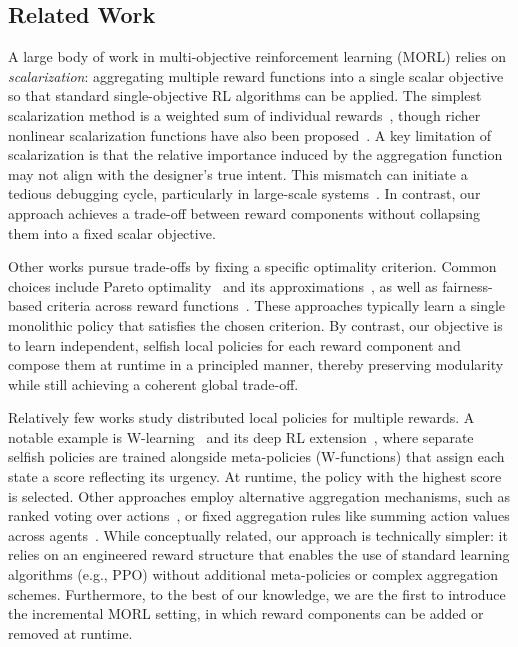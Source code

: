 \subsection{Related Work}

A large body of work in multi-objective reinforcement learning (MORL) relies on \emph{scalarization}: aggregating multiple reward functions into a single scalar objective so that standard single-objective RL algorithms can be applied. The simplest scalarization method is a weighted sum of individual rewards~\citep{gass1955computational}, though richer nonlinear scalarization functions have also been proposed~\citep{van2013scalarized}. A key limitation of scalarization is that the relative importance induced by the aggregation function may not align with the designer’s true intent. This mismatch can initiate a tedious debugging cycle, particularly in large-scale systems~\citep{hayes2022practicalguidemorl}. In contrast, our approach achieves a trade-off between reward components without collapsing them into a fixed scalar objective.

Other works pursue trade-offs by fixing a specific optimality criterion. Common choices include Pareto optimality~\citep{van2014multi} and its approximations~\citep{pirotta2015multi}, as well as fairness-based criteria across reward functions~\citep{park2024max,byeon2025multi,siddique2020learning}. These approaches typically learn a single monolithic policy that satisfies the chosen criterion. By contrast, our objective is to learn independent, selfish local policies for each reward component and compose them at runtime in a principled manner, thereby preserving modularity while still achieving a coherent global trade-off.

Relatively few works study distributed local policies for multiple rewards. A notable example is W-learning~\citep{humphrys1995w} and its deep RL extension~\citep{rosero2024multi}, where separate selfish policies are trained alongside meta-policies (W-functions) that assign each state a score reflecting its urgency. At runtime, the policy with the highest score is selected. Other approaches employ alternative aggregation mechanisms, such as ranked voting over actions~\citep{mendez2019multi}, or fixed aggregation rules like summing action values across agents~\citep{russell2003q}. While conceptually related, our approach is technically simpler: it relies on an engineered reward structure that enables the use of standard learning algorithms (e.g., PPO) without additional meta-policies or complex aggregation schemes. Furthermore, to the best of our knowledge, we are the first to introduce the incremental MORL setting, in which reward components can be added or removed at runtime.

